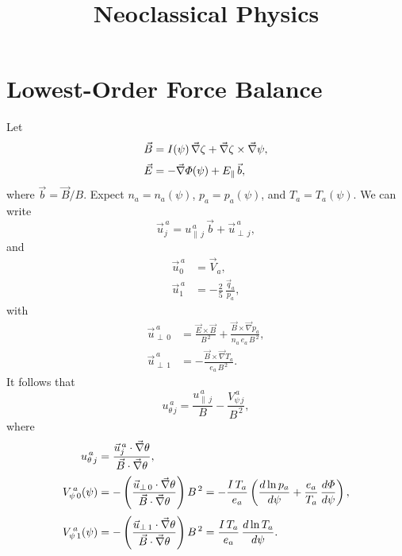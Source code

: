 \documentclass[12pt]{article}
\title{\bf Neoclassical Physics}
\date{}
\author{}
\begin{document}
\maketitle

\section{Lowest-Order Force Balance}
Let
\begin{align}
\vec{B} &= I(\psi)\,\vec{\nabla} \zeta + \vec{\nabla}\zeta\times \vec{\nabla}\psi,\\[0.5ex]
\vec{E} &= -\vec{\nabla}{\mit\Phi}(\psi) + E_\parallel\,\vec{b}, 
\end{align}
where $\vec{b}=\vec{B}/B$.
Expect $n_a=n_a(\psi)$, $p_a=p_a(\psi)$, and $T_a= T_a(\psi)$.
We can write
\begin{equation}
\vec{u}_j^{\,a} = u_{\parallel\,j}^{\,a}\,\vec{b} + \vec{u}_{\perp\,j}^{\,a},
\end{equation}
and 
\begin{align}
\vec{u}_0^{\,a} &= \vec{V}_a,\\[0.5ex]
\vec{u}_1^{\,a} &= - \frac{2}{5}\,\frac{\vec{q}_a}{p_a},
\end{align}
with 
\begin{align}
\vec{u}_{\perp\,0}^{\,a} &= \frac{\vec{E}\times \vec{B}}{B^{\,2}} + \frac{\vec{B}\times \vec{\nabla} p_a}{n_a\,e_a\,B^{\,2}},\\[0.5ex]
\vec{u}_{\perp\,1}^{\,a}&= - \frac{\vec{B}\times \vec{\nabla} T_a}{e_a\,B^{\,2}}.
\end{align}
It follows that
\begin{equation}\label{e24x}
u_{\theta\,j}^{\,a} = \frac{u_{\parallel\,j}^{\,a}}{B} - \frac{V_{\psi\,j}^{\,a}}{B^{\,2}},
\end{equation}
where
\begin{align}
u_{\theta\,j}^{\,a} &= \frac{\vec{u}_j^{\,a}\cdot\vec{\nabla}\theta}{\vec{B}\cdot\vec{\nabla}\theta},\\[0.5ex]
V_{\psi\,0}^{\,a}(\psi) &=-\left( \frac{\vec{u}_{\perp\,0}\cdot\vec{\nabla}\theta}{\vec{B}\cdot\vec{\nabla}\theta}\right)B^{\,2}=
- \frac{I\,T_a}{e_a}\left(\frac{d \ln p_a}{d\psi}+\frac{e_a}{T_a}\,\frac{d{\mit\Phi}}{d\psi}\right),\\[0.5ex]
V_{\psi\,1}^{\,a}(\psi) &= -\left(\frac{\vec{u}_{\perp\,1}\cdot\vec{\nabla}\theta}{\vec{B}\cdot\vec{\nabla}\theta}\right)B^{\,2}=
\frac{I\,T_a}{e_a}\,\frac{d\ln T_a}{d\psi}.
\end{align}
\end{document}
